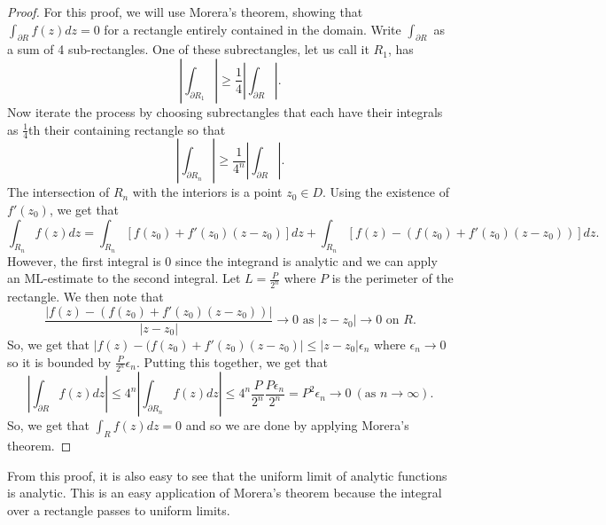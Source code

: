 \documentclass[11pt,leqno,oneside]{amsart}
\begin{document}
  \begin{proof}
    For this proof, we will use Morera's theorem, showing that
    $\int_{\partial R} f(z)dz = 0$ for a rectangle entirely contained
    in the domain. Write $\int_{\partial R}$ as a sum of 4
    sub-rectangles. One of these subrectangles, let us call it $R_1$,
    has \[
      \left|
        \int_{\partial R_1}
      \right| \geq 
      \frac{1}{4}\left|
        \int_{\partial R}
      \right|.
    \]
    Now iterate the process by choosing subrectangles that each have
    their integrals as $\frac{1}{4}$th their containing rectangle so that \[
      \left|
        \int_{\partial R_n}
      \right| \geq
      \frac{1}{4^n}\left|
        \int_{\partial R}
      \right|.
    \]
    The intersection of $R_n$ with the interiors is a point $z_0 \in
    D$. Using the existence of $f'(z_0)$, we get that \[
      \int_{R_n} f(z)dz = \int_{R_n} [f(z_0) + f'(z_0)(z-z_0)]dz +
      \int_{R_n} [f(z) - (f(z_0) + f'(z_0)(z-z_0))]dz.
    \]
    However, the first integral is 0 since the integrand is analytic
    and we can apply an ML-estimate to the second integral. Let $L =
    \frac{P}{2^n}$ where $P$ is the perimeter of the rectangle. We
    then note that \[
      \frac{|f(z)-(f(z_0) + f'(z_0)(z-z_0))|}{|z-z_0|} \to 0 \text{ as
      } |z-z_0| \to 0 \text{ on } R.
    \]
    So, we get that $|f(z)-(f(z_0) + f'(z_0)(z-z_0)| \leq |z-z_0|
    \epsilon_n$ where $\epsilon_n \to 0$ so it is bounded by
    $\frac{P}{2^n}\epsilon_n$. Putting this together, we get that \[
      \left|
        \int_{\partial R} f(z)dz
      \right| \leq 4^n 
      \left|
        \int_{\partial R_n} f(z)dz
      \right| \leq 4^n \frac{P}{2^n}\frac{P \epsilon_n}{2^n} = P^2
      \epsilon_n \to 0 ~ (\text{as }n \to \infty).
    \]
    So, we get that $\int_R f(z)dz = 0$ and so we are done by applying
    Morera's theorem.
  \end{proof}
  From this proof, it is also easy to see that the uniform limit of
  analytic functions is analytic. This is an easy application of
  Morera's theorem because the integral over a rectangle passes to
  uniform limits.
\end{document}
